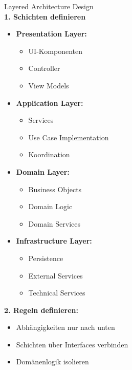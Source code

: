 \begin{KR}{Layered Architecture Design}\\
\textbf{1. Schichten definieren}
\begin{itemize}
    \item \textbf{Presentation Layer:}
    \begin{itemize}
        \item UI-Komponenten
        \item Controller
        \item View Models
    \end{itemize}
    
    \item \textbf{Application Layer:}
    \begin{itemize}
        \item Services
        \item Use Case Implementation
        \item Koordination
    \end{itemize}
    
    \item \textbf{Domain Layer:}
    \begin{itemize}
        \item Business Objects
        \item Domain Logic
        \item Domain Services
    \end{itemize}
    
    \item \textbf{Infrastructure Layer:}
    \begin{itemize}
        \item Persistence
        \item External Services
        \item Technical Services
    \end{itemize}
\end{itemize}

\textbf{2. Regeln definieren:}
\begin{itemize}
    \item Abhängigkeiten nur nach unten
    \item Schichten über Interfaces verbinden
    \item Domänenlogik isolieren
\end{itemize}
\end{KR}

